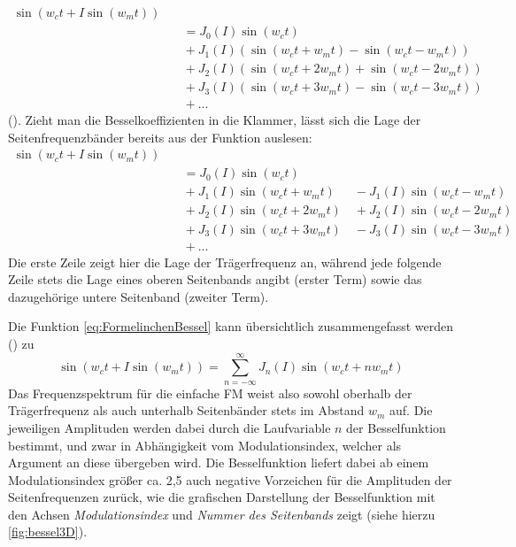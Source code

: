 \begin{equation}
\begin{split}
\sin(w_ct + I\sin(w_mt)) \\ &\quad = J_0(I)\sin(w_ct) \\ &\quad + J_1(I)(\sin(w_ct + w_mt) - \sin(w_ct - w_mt)) \\ &\quad + J_2(I)(\sin(w_ct + 2w_mt)+\sin(w_ct-2w_mt)) \\ &\quad  + J_3(I)(\sin(w_ct + 3w_mt) - \sin(w_ct - 3w_mt)) \\ &\quad  + ...
\end{split}
\end{equation}
(\cite[S.528]{chowningPaper}). Zieht man die Besselkoeffizienten in die Klammer, lässt sich die Lage der Seitenfrequenzbänder bereits aus der Funktion auslesen:
\begin{equation}\label{eq:FormelinchenBessel}
\begin{split}
\sin(w_ct + I\sin(w_mt)) \\ &\quad = J_0(I)\sin(w_ct) \\ &\quad + J_1(I)\sin(w_ct + w_mt) \quad\enspace - J_1(I)\sin(w_ct - w_mt) \\ &\quad + J_2(I)\sin(w_ct + 2w_mt) \quad + J_2(I)\sin(w_ct-2w_mt) \\ &\quad  + J_3(I)\sin(w_ct + 3w_mt) \quad - J_3(I)\sin(w_ct - 3w_mt) \\ &\quad  + ...
\end{split}
\end{equation}
Die erste Zeile zeigt hier die Lage der Trägerfrequenz an, während jede folgende Zeile stets die Lage eines oberen Seitenbands angibt (erster Term) sowie das dazugehörige untere Seitenband (zweiter Term). 

Die Funktion \ref{eq:FormelinchenBessel} kann übersichtlich zusammengefasst werden (\cite{schottiWeb}) zu 
\begin{equation}\label{esq:Besselbabymonster}
\sin(w_ct + I\sin(w_mt)) = \sum_{n=-\infty}^{\infty}J_n(I)\sin(w_ct+nw_mt)
\end{equation}
Das Frequenzspektrum für die einfache FM weist also sowohl oberhalb der Trägerfrequenz als auch unterhalb Seitenbänder stets im Abstand \begin{math} w_m \end{math} auf. Die jeweiligen Amplituden werden dabei durch die Laufvariable $n$ der Besselfunktion bestimmt, und zwar in Abhängigkeit vom Modulationsindex, welcher als Argument an diese übergeben wird. Die Besselfunktion liefert dabei ab einem Modulationsindex größer ca. 2,5 auch negative Vorzeichen für die Amplituden der Seitenfrequenzen zurück, wie die grafischen Darstellung der Besselfunktion mit den Achsen \textit{Modulationsindex} und \textit{Nummer des Seitenbands} zeigt (siehe hierzu \ref{fig:bessel3D}). 

